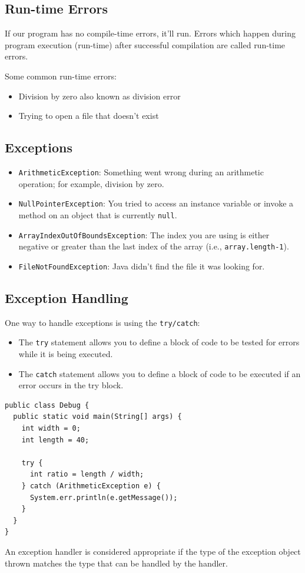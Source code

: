 \documentclass[a4paper, 12pt]{article}
\begin{document}
\subsection{Run-time Errors}
If our program has no compile-time errors, it'll run. Errors which happen during program execution (run-time) after successful compilation are called run-time errors.

Some common run-time errors:
\begin{itemize}
\item Division by zero also known as division error

\item Trying to open a file that doesn't exist

\end{itemize}

\subsection{Exceptions}
\begin{itemize}
\item \verb|ArithmeticException|: Something went wrong during an arithmetic operation; for example, division by zero.

\item \verb|NullPointerException|: You tried to access an instance variable or invoke a method on an object that is currently \verb|null|.

\item \verb|ArrayIndexOutOfBoundsException|: The index you are using is either negative or greater than the last index of the array (i.e., \verb|array.length-1|).

\item \verb|FileNotFoundException|: Java didn't find the file it was looking for.

\end{itemize}

\subsection{Exception Handling}
One way to handle exceptions is using the \verb|try/catch|:
\begin{itemize}
\item The \verb|try| statement allows you to define a block of code to be tested for errors while it is being executed.

\item The \verb|catch| statement allows you to define a block of code to be executed if an error occurs in the try block.

\end{itemize}
\begin{verbatim}
public class Debug {
  public static void main(String[] args) {    
    int width = 0;
    int length = 40;
    
    try {
      int ratio = length / width;
    } catch (ArithmeticException e) {
      System.err.println(e.getMessage());
    }    
  }  
}
\end{verbatim}
An exception handler is considered appropriate if the type of the exception object thrown matches the type that can be handled by the handler.
\end{document}
